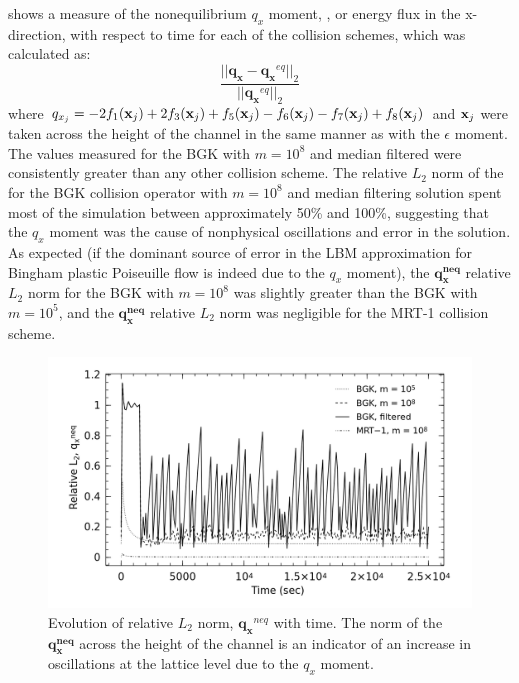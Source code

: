  shows a measure of the nonequilibrium $q_x$ moment, \DIFdelbegin {}\DIFdelend \DIFaddbegin {}\DIFaddend , or energy flux in the x-direction, with respect to time for each of the collision schemes, which was calculated as:
\begin{equation}
    \frac{||\mathbf{q_x} - \mathbf{q_x}^{eq}||_2}{||\mathbf{q_x}^{eq}||_2}
\end{equation}
\noindent where $q_{x_j} = - 2f_1(\mathbf{x}_j) + 2f_3(\mathbf{x}_j) + f_5(\mathbf{x}_j) - f_6(\mathbf{x}_j) - f_7(\mathbf{x}_j) + f_8(\mathbf{x}_j)$ and $\mathbf{x}_j$ were taken across the height of the channel in the same manner as with the $\epsilon$ moment.
The values measured for the BGK with $m = 10^8$ and median filtered were consistently greater than any other collision scheme.
The relative $L_2$ norm of the \DIFdelbegin {}\DIFdelend \DIFaddbegin {}\DIFaddend for the BGK collision operator with $m = 10^8$ and median filtering solution spent most of the simulation between approximately 50\% and 100\%, suggesting that the $q_x$ moment was \DIFdelbegin {}\DIFdelend \DIFaddbegin {}\DIFaddend the cause of \DIFdelbegin {}\DIFdelend nonphysical oscillations and error in the solution.
As expected (if the dominant source of error in the LBM approximation for Bingham plastic Poiseuille flow is indeed due to the $q_x$ moment), the $\mathbf{q_x^{neq}}$ relative $L_2$ norm for the BGK with $m = 10^8$ was slightly greater than the BGK with $m = 10^5$, and the $\mathbf{q_x^{neq}}$ relative $L_2$ norm was negligible for the MRT-1 collision scheme.
\DIFaddbegin {}\DIFaddend 

\begin{figure}
	\centering
    \includegraphics[width=\linewidth]{figs/poise-bingham/qx}
    \caption{Evolution of relative $L_2$ norm, $\mathbf{q_x}^{neq}$ with time. The norm of the $\mathbf{q_x^{neq}}$ across the height of the channel is an indicator of an increase in oscillations at the lattice level due to the $q_x$ moment.}
    \label{fig:qx}
\end{figure}

